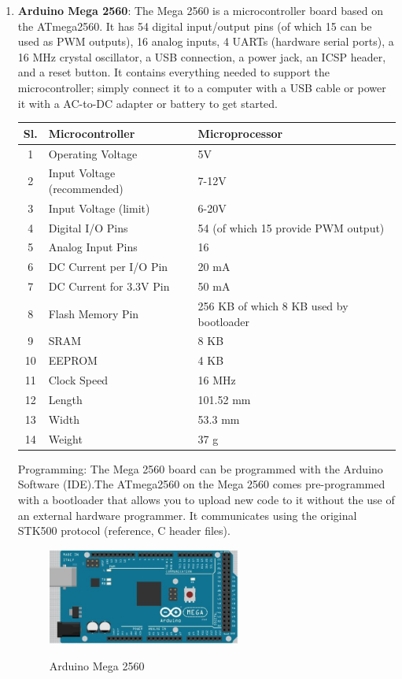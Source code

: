 \begin{enumerate}
	\item \textbf{Arduino Mega 2560}: The Mega 2560 is a microcontroller board based on the ATmega2560. It has 54 digital input/output pins (of which 15 can be used as PWM outputs), 16 analog inputs, 4 UARTs (hardware serial ports), a 16 MHz crystal oscillator, a USB connection, a power jack, an ICSP header, and a reset button. It contains everything needed to support the microcontroller; simply connect it to a computer with a USB cable or power it with a AC-to-DC adapter or battery to get started. 

\begin{center}
 \begin{tabular}{| c |  p{6cm} | p{6cm} |} 
 \hline
 Sl. & Microcontroller & Microprocessor \\ [0.5ex] 
 \hline\hline
 1 & Operating Voltage & 5V \\ 
 \hline
 2 & Input Voltage (recommended) & 7-12V \\
 \hline
 3 & Input Voltage (limit) & 6-20V \\
 \hline
 4 & Digital I/O Pins & 54 (of which 15 provide PWM output) \\
 \hline
 5 & Analog Input Pins & 16 \\
 \hline
6 & DC Current per I/O Pin & 20 mA \\
 \hline
7 & DC Current for 3.3V Pin & 50 mA \\
 \hline
8 & Flash Memory Pin & 256 KB of which 8 KB used by bootloader \\
 \hline
9 & SRAM & 8 KB \\
 \hline
10 & EEPROM & 4 KB \\
 \hline
11 & Clock Speed & 16 MHz \\
 \hline
12 & Length & 101.52 mm \\
 \hline
13 & Width & 53.3 mm \\
 \hline
14 & Weight & 37 g \\
 \hline
\end{tabular}
\end{center}

Programming: The Mega 2560 board can be programmed with the Arduino Software (IDE).The ATmega2560 on the Mega 2560 comes pre-programmed with a bootloader that allows you to upload new code to it without the use of an external hardware programmer. It communicates using the original STK500 protocol (reference, C header files).
\begin{figure}
\centering
\includegraphics[width=0.6\textwidth]{./arduino}\\[0.1in]
\label{fig:Arduino Mega 2560}
\caption{Arduino Mega 2560}
\end{figure}



\end{enumerate}
